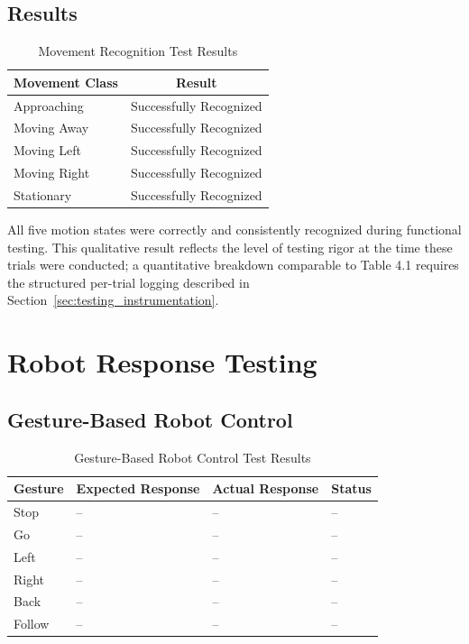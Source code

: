 \subsection{Results}

\begin{table}[H]
\centering
\caption{Movement Recognition Test Results}
\label{tab:movement_results}
\begin{tabular}{|l|c|}
\hline
\textbf{Movement Class} & \textbf{Result} \\
\hline
Approaching & Successfully Recognized \\
\hline
Moving Away & Successfully Recognized \\
\hline
Moving Left & Successfully Recognized \\
\hline
Moving Right & Successfully Recognized \\
\hline
Stationary & Successfully Recognized \\
\hline
\end{tabular}
\end{table}

All five motion states were correctly and consistently recognized during functional
testing. This qualitative result reflects the level of testing rigor at the time these
trials were conducted; a quantitative breakdown comparable to Table 4.1 requires the
structured per-trial logging described in Section~\ref{sec:testing_instrumentation}.

\section{Robot Response Testing}

\subsection{Gesture-Based Robot Control}

\begin{table}[H]
\centering
\caption{Gesture-Based Robot Control Test Results}
\label{tab:robot_response}
\begin{tabular}{|l|l|l|l|}
\hline
\textbf{Gesture} & \textbf{Expected Response} & \textbf{Actual Response} & \textbf{Status} \\
\hline
Stop & -- & -- & -- \\
\hline
Go & -- & -- & -- \\
\hline
Left & -- & -- & -- \\
\hline
Right & -- & -- & -- \\
\hline
Back & -- & -- & -- \\
\hline
Follow & -- & -- & -- \\
\hline
\end{tabular}
\end{table}
